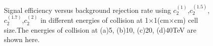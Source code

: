 \begin{figure}
\begin{center}

\end{center}
\caption{Signal efficiency versus background rejection rate using $c_2^{(1)}$,$c_2^{(1.5)}$,$c_2^{(1.7)}$,$c_2^{(2)}$ in different energies of collision at 1$\times$1(cm$\times$cm) cell size.The energies of collision at (a)5, (b)10, (c)20, (d)40TeV are shown here.}
\label{cluster_r012_c_variable}
\end{figure}


